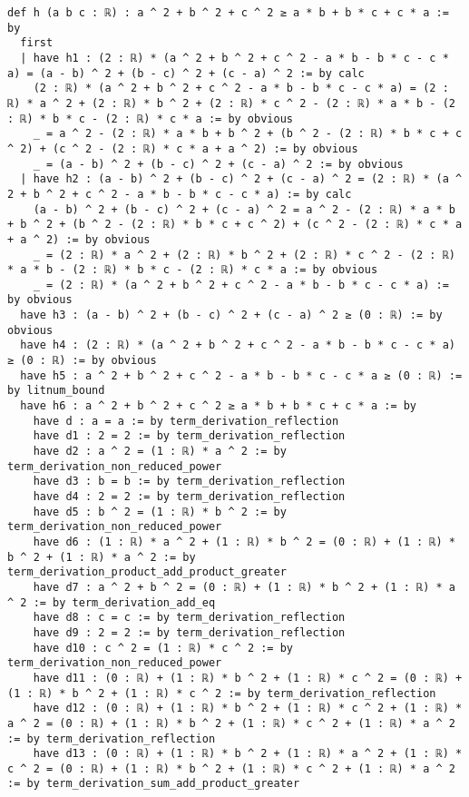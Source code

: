 \documentclass{article}
\begin{document}
\begin{tcolorbox}[colback=white!10, width=\linewidth]
\begin{lstlisting}[language=Lean4]
def h (a b c : ℝ) : a ^ 2 + b ^ 2 + c ^ 2 ≥ a * b + b * c + c * a := by
  first
  | have h1 : (2 : ℝ) * (a ^ 2 + b ^ 2 + c ^ 2 - a * b - b * c - c * a) = (a - b) ^ 2 + (b - c) ^ 2 + (c - a) ^ 2 := by calc
    (2 : ℝ) * (a ^ 2 + b ^ 2 + c ^ 2 - a * b - b * c - c * a) = (2 : ℝ) * a ^ 2 + (2 : ℝ) * b ^ 2 + (2 : ℝ) * c ^ 2 - (2 : ℝ) * a * b - (2 : ℝ) * b * c - (2 : ℝ) * c * a := by obvious
    _ = a ^ 2 - (2 : ℝ) * a * b + b ^ 2 + (b ^ 2 - (2 : ℝ) * b * c + c ^ 2) + (c ^ 2 - (2 : ℝ) * c * a + a ^ 2) := by obvious
    _ = (a - b) ^ 2 + (b - c) ^ 2 + (c - a) ^ 2 := by obvious
  | have h2 : (a - b) ^ 2 + (b - c) ^ 2 + (c - a) ^ 2 = (2 : ℝ) * (a ^ 2 + b ^ 2 + c ^ 2 - a * b - b * c - c * a) := by calc
    (a - b) ^ 2 + (b - c) ^ 2 + (c - a) ^ 2 = a ^ 2 - (2 : ℝ) * a * b + b ^ 2 + (b ^ 2 - (2 : ℝ) * b * c + c ^ 2) + (c ^ 2 - (2 : ℝ) * c * a + a ^ 2) := by obvious
    _ = (2 : ℝ) * a ^ 2 + (2 : ℝ) * b ^ 2 + (2 : ℝ) * c ^ 2 - (2 : ℝ) * a * b - (2 : ℝ) * b * c - (2 : ℝ) * c * a := by obvious
    _ = (2 : ℝ) * (a ^ 2 + b ^ 2 + c ^ 2 - a * b - b * c - c * a) := by obvious
  have h3 : (a - b) ^ 2 + (b - c) ^ 2 + (c - a) ^ 2 ≥ (0 : ℝ) := by obvious
  have h4 : (2 : ℝ) * (a ^ 2 + b ^ 2 + c ^ 2 - a * b - b * c - c * a) ≥ (0 : ℝ) := by obvious
  have h5 : a ^ 2 + b ^ 2 + c ^ 2 - a * b - b * c - c * a ≥ (0 : ℝ) := by litnum_bound
  have h6 : a ^ 2 + b ^ 2 + c ^ 2 ≥ a * b + b * c + c * a := by
    have d : a = a := by term_derivation_reflection
    have d1 : 2 = 2 := by term_derivation_reflection
    have d2 : a ^ 2 = (1 : ℝ) * a ^ 2 := by term_derivation_non_reduced_power
    have d3 : b = b := by term_derivation_reflection
    have d4 : 2 = 2 := by term_derivation_reflection
    have d5 : b ^ 2 = (1 : ℝ) * b ^ 2 := by term_derivation_non_reduced_power
    have d6 : (1 : ℝ) * a ^ 2 + (1 : ℝ) * b ^ 2 = (0 : ℝ) + (1 : ℝ) * b ^ 2 + (1 : ℝ) * a ^ 2 := by term_derivation_product_add_product_greater
    have d7 : a ^ 2 + b ^ 2 = (0 : ℝ) + (1 : ℝ) * b ^ 2 + (1 : ℝ) * a ^ 2 := by term_derivation_add_eq
    have d8 : c = c := by term_derivation_reflection
    have d9 : 2 = 2 := by term_derivation_reflection
    have d10 : c ^ 2 = (1 : ℝ) * c ^ 2 := by term_derivation_non_reduced_power
    have d11 : (0 : ℝ) + (1 : ℝ) * b ^ 2 + (1 : ℝ) * c ^ 2 = (0 : ℝ) + (1 : ℝ) * b ^ 2 + (1 : ℝ) * c ^ 2 := by term_derivation_reflection
    have d12 : (0 : ℝ) + (1 : ℝ) * b ^ 2 + (1 : ℝ) * c ^ 2 + (1 : ℝ) * a ^ 2 = (0 : ℝ) + (1 : ℝ) * b ^ 2 + (1 : ℝ) * c ^ 2 + (1 : ℝ) * a ^ 2 := by term_derivation_reflection
    have d13 : (0 : ℝ) + (1 : ℝ) * b ^ 2 + (1 : ℝ) * a ^ 2 + (1 : ℝ) * c ^ 2 = (0 : ℝ) + (1 : ℝ) * b ^ 2 + (1 : ℝ) * c ^ 2 + (1 : ℝ) * a ^ 2 := by term_derivation_sum_add_product_greater

\end{lstlisting}
\end{tcolorbox}
\end{document}
